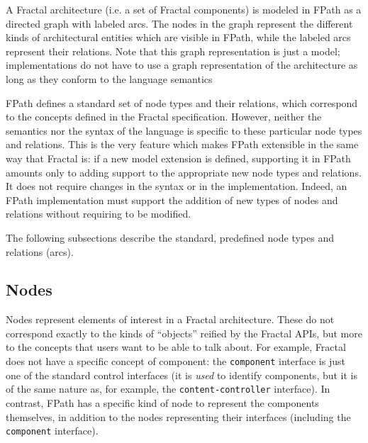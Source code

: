 \documentclass[a4paper,12pt]{report}
\begin{document}
A Fractal architecture (i.e. a set of Fractal components) is modeled in FPath as a
directed graph with labeled arcs. The nodes in the graph represent the different kinds of
architectural entities which are visible in FPath, while the labeled arcs represent their
relations. Note that this graph representation is just a model; implementations do not
have to use a graph representation of the architecture as long as they conform to the
language semantics

FPath defines a standard set of node types and their relations, which correspond to the
concepts defined in the Fractal specification. However, neither the semantics nor the
syntax of the language is specific to these particular node types and relations. This is
the very feature which makes FPath extensible in the same way that Fractal is: if a new
model extension is defined, supporting it in FPath amounts only to adding support to the
appropriate new node types and relations. It does not require changes in the syntax or in
the implementation. Indeed, an FPath implementation must support the addition of new types
of nodes and relations without requiring to be modified.

The following subsections describe the standard, predefined node types and relations
(arcs).

\subsection{Nodes}
\label{sec:nodes}

Nodes represent elements of interest in a Fractal architecture. These do not correspond
exactly to the kinds of ``objects'' reified by the Fractal APIs, but more to the concepts
that users want to be able to talk about. For example, Fractal does not have a specific
concept of component: the \texttt{component} interface is just one of the standard control
interfaces (it is \emph{used} to identify components, but it is of the same nature as, for
example, the \texttt{content-controller} interface). In contrast, FPath has a specific
kind of node to represent the components themselves, in addition to the nodes representing
their interfaces (including the \texttt{component} interface).
\end{document}

